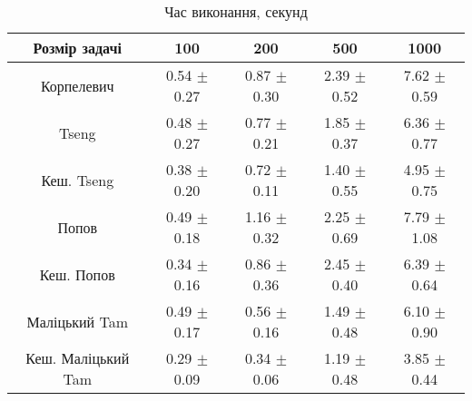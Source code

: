 \begin{table}[H]
	\centering
	\begin{tabular}{|c||c|c|c|c|}\hline
		Розмір задачі & 100 & 200 & 500 & 1000 \\ \hline \hline
		Корпелевич & 0.54 $\pm$ 0.27 & 0.87 $\pm$ 0.30 & 2.39 $\pm$ 0.52 & 7.62 $\pm$ 0.59 \\ \hline
		Tseng & 0.48 $\pm$ 0.27 & 0.77 $\pm$ 0.21 & 1.85 $\pm$ 0.37 & 6.36 $\pm$ 0.77 \\ \hline
		Кеш. Tseng & 0.38 $\pm$ 0.20 & 0.72 $\pm$ 0.11 & 1.40 $\pm$ 0.55 & 4.95 $\pm$ 0.75 \\ \hline
		Попов & 0.49 $\pm$ 0.18 & 1.16 $\pm$ 0.32 & 2.25 $\pm$ 0.69 & 7.79 $\pm$ 1.08 \\ \hline
		Кеш. Попов & 0.34 $\pm$ 0.16 & 0.86 $\pm$ 0.36 & 2.45 $\pm$ 0.40 & 6.39 $\pm$ 0.64 \\ \hline
		Маліцький Tam & 0.49 $\pm$ 0.17 & 0.56 $\pm$ 0.16 & 1.49 $\pm$ 0.48 & 6.10 $\pm$ 0.90 \\ \hline
		Кеш. Маліцький Tam & 0.29 $\pm$ 0.09 & 0.34 $\pm$ 0.06 & 1.19 $\pm$ 0.48 & 3.85 $\pm$ 0.44 \\ \hline
	\end{tabular}
	\caption{Час виконання, секунд}
\end{table}
